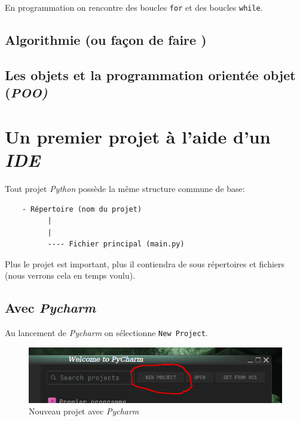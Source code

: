 \documentclass[a4paper,11pt]{book}
\begin{document}
En programmation on rencontre des boucles \texttt{for} et des boucles \texttt{while}.
\bigskip

\section{Algorithmie (ou \og façon de faire \fg{})}
\medskip

\section{Les objets et la programmation orientée objet (\textit{POO)}}
\medskip

\chapter{Un premier projet à l'aide d'un \textit{IDE}}
Tout projet \textit{Python} possède la même structure commune de base:
\begin{verbatim}
    - Répertoire (nom du projet)
          |
          |
          ---- Fichier principal (main.py)
\end{verbatim}
\medskip

Plus le projet est important, plus il contiendra de sous répertoires et fichiers (nous verrons cela en temps voulu).
\medskip

\section{Avec \textit{Pycharm}}
Au lancement de \textit{Pycharm} on sélectionne \texttt{New Project}.
\begin{figure}[h]
\begin{center}
\includegraphics[scale=0.3]{IMG/Pycharm-01.png}
\caption{Nouveau projet avec \textit{Pycharm}}
\end{center}
\end{figure}
\medskip
\end{document}
